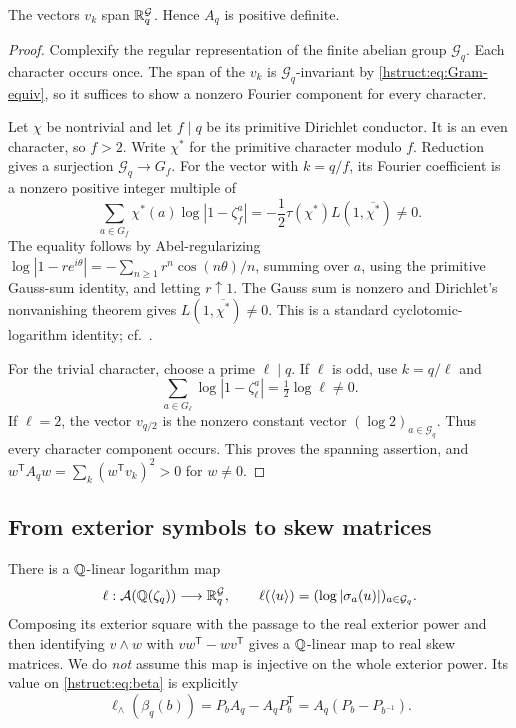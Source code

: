 \begin{lemma}\label{hstruct:lem:positive-Gram}
The vectors $v_k$ span $\mathbb R^\mathcal{G}_q$. Hence $A_q$ is positive definite.
\end{lemma}
\begin{proof}
Complexify the regular representation of the finite abelian group $\mathcal{G}_q$.
Each character occurs once. The span of the $v_k$ is $\mathcal{G}_q$-invariant by
\eqref{hstruct:eq:Gram-equiv}, so it suffices to show a nonzero Fourier component
for every character.

Let $\chi$ be nontrivial and let $f\mid q$ be its primitive Dirichlet
conductor. It is an even character, so $f>2$. Write $\chi^*$ for the
primitive character modulo $f$. Reduction gives a surjection
$\mathcal{G}_q\longrightarrow G_f$. For the vector with $k=q/f$, its Fourier
coefficient is a nonzero positive integer multiple of
\begin{equation}\label{hstruct:eq:log-L}
 \sum_{a\in G_f}\chi^*(a)\log|1-\zeta_f^a|
 =-\frac12\tau(\chi^*)L(1,\overline{\chi^*})\ne0.
\end{equation}
The equality follows by Abel-regularizing
$\log|1-re^{i\theta}|=-\sum_{n\ge1}r^n\cos(n\theta)/n$,
summing over $a$, using the primitive Gauss-sum identity, and letting
$r\uparrow1$. The Gauss sum is nonzero and Dirichlet's nonvanishing
theorem gives $L(1,\overline{\chi^*})\ne0$. This is a standard
cyclotomic-logarithm identity; cf.\ \cite{hstruct:Washington,hstruct:Sharifi}.

For the trivial character, choose a prime $\ell\mid q$. If $\ell$ is
odd, use $k=q/\ell$ and
\[
 \sum_{a\in G_\ell}\log|1-\zeta_\ell^a|
 =\tfrac12\log\ell\ne0.
\]
If $\ell=2$, the vector $v_{q/2}$ is the nonzero constant vector
$(\log2)_{a\in \mathcal{G}_q}$. Thus every character component occurs. This proves
the spanning assertion, and
$w^{\mathsf T}A_qw=\sum_k(w^{\mathsf T}v_k)^2>0$ for $w\ne0$.
\end{proof}

\subsection{From exterior symbols to skew matrices}

There is a $\mathbb{Q}$-linear logarithm map
\[
 \ell:\mathcal A(\mathbb{Q}(\zeta_q))\longrightarrow\mathbb R^\mathcal{G}_q,
 \qquad\ell(\langle u\rangle)=(\log|\sigma_a(u)|)_{a\in \mathcal{G}_q}.
\]
Composing its exterior square with the passage to the real exterior
power and then identifying $v\wedge w$ with
$vw^{\mathsf T}-wv^{\mathsf T}$ gives a $\mathbb{Q}$-linear map to real skew
matrices. We do \emph{not} assume this map is injective on the whole
exterior power. Its value on \eqref{hstruct:eq:beta} is explicitly
\begin{equation}\label{hstruct:eq:skew-image}
 \ell_\wedge(\beta_q(b))
 =P_bA_q-A_qP_b^{\mathsf T}
 =A_q(P_b-P_{b^{-1}}).
\end{equation}

